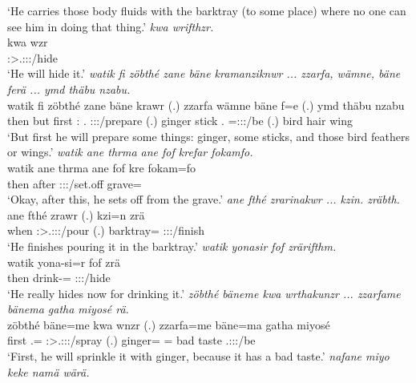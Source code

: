 \begin{exe}
	\trans `He carries those body fluids with the barktray (to some place) where no one can see him in doing that thing.'
	\emph{kwa wrifthzr.}\\
	\gll kwa wzr\\
	\Fut{} \Stsg:\Sbj>\Tsg.\F:\Obj:\Nonpast:\Ipfv/hide\\
	\trans `He will hide it.'
	\emph{watik fi zöbthé zane bäne kramanziknwr ... zzarfa, wämne, bäne ferä ... ymd thäbu nzabu.}\\
	\gll watik fi zöbthé zane bäne krawr (.) zzarfa wämne bäne f=e (.) ymd thäbu nzabu\\
	then but first \Dem:\Prox{} \Recog.\Abs{} \Stsg:\Sbj:\Irr:\Ipfv/prepare (.) ginger stick \Recog.\Abs{} \Dist=\Stpl:\Sbj:\Nonpast:\Ipfv/be (.) bird hair wing\\
	\trans `But first he will prepare some things: ginger, some sticks, and those bird feathers or wings.'
	\emph{watik ane thrma ane fof krefar fokamfo.}\\
	\gll watik ane thrma ane fof kre fokam=fo\\
	then \Dem{} after \Dem{} \Emph{} \Stsg:\Sbj:\Irr:\Pfv/set.off grave=\All\\
	\trans `Okay, after this, he sets off from the grave.'
	\emph{ane fthé zrarinakwr ... kzin. zräbth.}\\
	\gll ane fthé zrawr (.) kzi=n zrä\\
	\Dem{} when \Stsg:\Sbj>\Tsg.\F:\Obj:\Irr:\Ipfv/pour (.) barktray=\Loc{} \Stsg:\Sbj:\Irr:\Pfv/finish\\
	\trans `He finishes pouring it in the barktray.'
	\emph{watik yonasir fof zrärifthm.}\\
	\gll watik yona-si=r fof zrä\\
	then drink-\Nmlz=\Purp{} \Emph{} \Stsg:\Sg:\Irr:\Pfv/hide\\
	\trans `He really hides now for drinking it.'
	\emph{zöbthé bäneme kwa wrthakunzr ... zzarfame bänema gatha miyosé rä.}\\
	\gll zöbthé bäne=me kwa wnzr (.) zzarfa=me bäne=ma gatha miyosé \\
	first \Recog.=\Ins{} \Fut{} \Stsg:\Sbj>\Tsg.\F:\Obj:\Nonpast:\Ipfv/spray (.) ginger=\Ins{} \Recog=\Char{} bad taste \Tsg.\F:\Sbj:\Nonpast:\Ipfv/be\\
	\trans `First, he will sprinkle it with ginger, because it has a bad taste.'
	\emph{nafane miyo keke namä wärä.}\\

\end{exe}
